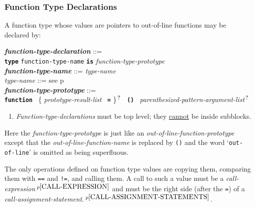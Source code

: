 \documentclass[12pt]{article}
\newcommand{\TT}[1]{{\tt \bfseries #1}}
\newcommand{\QMARK}{{$^{\,\mbox{\footnotesize ?}}$}}
\newcommand{\ttkey}[1]{{\tt \bfseries #1}}
\newcommand{\emkey}[1]{{\em \bfseries #1}}
\newcommand{\pagref}[1]{p\pageref{#1}}
\newcommand{\pagnote}[1]{$\,^{p\pageref{#1}}$}
\newenvironment{indpar}[1][0.3in]%
	{\begin{list}{}%
		     {\setlength{\itemsep}{0in}%
		      \setlength{\topsep}{0in}%
		      \setlength{\parsep}{1ex}%
		      \setlength{\labelwidth}{#1}%
		      \setlength{\leftmargin}{#1}%
		      \addtolength{\leftmargin}{\labelsep}}%
	 \item}%
	{\end{list}}
\begin{document}
\subsubsection{Function Type Declarations}
\label{FUNCTION-TYPE-DECLARATIONS}

A function type whose values are pointers to out-of-line
functions may be declared by:

\begin{indpar}
\emkey{function-type-declaration}\label{FUNCTION-TYPE-DECLARATION} ::= \\
\hspace*{0.5in}
    \ttkey{type} {\tt function-type-name} \TT{is}
                 {\em function-type-prototype}
\\[0.5ex]
\emkey{function-type-name} ::= {\em type-name}
\\[0.5ex]
{\em type-name} ::= see \pagref{TYPE-NAME}
\\[0.5ex]
\emkey{function-type-prototype}%
	\label{FUNCTION-TYPE-PROTOTYPE} ::= \\
\hspace*{0.25in} \ttkey{function}~
        \{ {\em prototype-result-list}~ \TT{=} \}\QMARK{}~
	\TT{()}~ {\em parenthesized-pattern-argument-list}\QMARK{}
\begin{enumerate}
\item
{\em Function-type-declarations} must be top level; they
\underline{cannot} be inside subblocks.
\end{enumerate}
\end{indpar}

Here the {\em function-type-prototype} is just like an
{\em out-of-line-function-prototype} except that the
{\em out-of-line-function-name} is replaced by {\tt ()} and
the word `{\tt out-of-line}' is omitted as being superfluous.

The only operations defined on function type values are copying them,
comparing them with {\tt ==} and {\tt !=}, and
calling them.  A call to such a value must be a
{\em call-expression}\pagnote{CALL-EXPRESSION} and
must be the right side (after the {\tt =})
of a {\em call-assignment-state\-ment}.\pagnote{CALL-ASSIGNMENT-STATEMENTS}.
\end{document}
